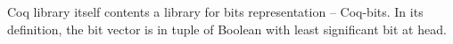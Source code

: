 


Coq library itself contents a library for bits representation -- Coq-bits.
In its definition, the bit vector is in tuple of Boolean with least significant bit at head.



